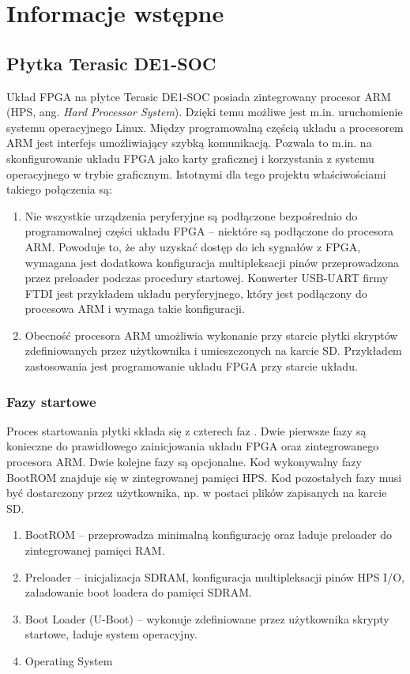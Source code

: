 \section{Informacje wstępne}
\label{sec:infornacje-wstepne}

\subsection{Płytka Terasic DE1-SOC}
Układ FPGA na płytce Terasic DE1-SOC posiada zintegrowany procesor ARM (HPS, ang. \textit{Hard Processor System}). Dzięki temu możliwe jest m.in. uruchomienie systemu operacyjnego Linux. Między programowalną częścią układu a procesorem ARM jest interfejs umożliwiający szybką komunikacją. Pozwala to m.in. na skonfigurowanie układu FPGA jako karty graficznej i korzystania z systemu operacyjnego w trybie graficznym. Istotnymi dla tego projektu właściwościami takiego połączenia są:
\begin{enumerate}
\item Nie wszystkie urządzenia peryferyjne są podłączone bezpośrednio do programowalnej części układu FPGA -- niektóre są podłączone do procesora ARM. Powoduje to, że aby uzyskać dostęp do ich sygnałów z FPGA, wymagana jest dodatkowa konfiguracja multipleksacji pinów przeprowadzona przez preloader podczas procedury startowej. Konwerter USB-UART firmy FTDI jest przykładem układu peryferyjnego, który jest podłączony do procesowa ARM i wymaga takie konfiguracji.
\item Obecność procesora ARM umożliwia wykonanie przy starcie płytki skryptów zdefiniowanych przez użytkownika i umieszczonych na karcie SD. Przykładem zastosowania jest programowanie układu FPGA przy starcie układu.
\end{enumerate}

\subsubsection{Fazy startowe}
Proces startowania płytki składa się z czterech faz \cite[p. 1068]{altera-vol3}. Dwie pierwsze fazy są konieczne do prawidłowego zainicjowania układu FPGA oraz zintegrowanego procesora ARM. Dwie kolejne fazy są opcjonalne. Kod wykonywalny fazy BootROM znajduje się w zintegrowanej pamięci HPS. Kod pozostałych fazy musi być dostarczony przez użytkownika, np. w postaci plików zapisanych na karcie SD.
\begin{enumerate}[noitemsep]
\item BootROM -- przeprowadza minimalną konfigurację oraz ładuje preloader do zintegrowanej pamięci RAM.
\item Preloader -- inicjalizacja SDRAM, konfiguracja multipleksacji pinów HPS I/O, załadowanie boot loadera do pamięci SDRAM.
\item Boot Loader (U-Boot) -- wykonuje zdefiniowane przez użytkownika skrypty startowe, ładuje system operacyjny.
\item Operating System
\end{enumerate}

